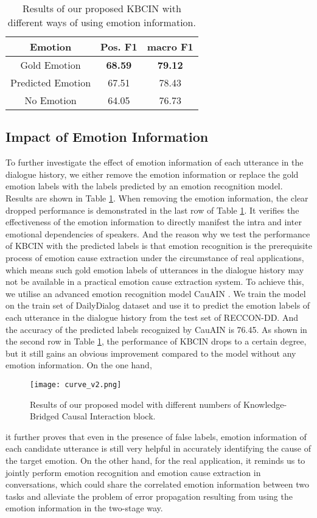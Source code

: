 \documentclass[letterpaper]{article} \usepackage{aaai23}  \usepackage{times}  \usepackage{helvet}  \usepackage{courier}  \usepackage[hyphens]{url}  \usepackage{graphicx} \urlstyle{rm} \def\UrlFont{\rm}  \usepackage{natbib}  \usepackage{caption} \frenchspacing  \setlength{\pdfpagewidth}{8.5in} \setlength{\pdfpageheight}{11in} \usepackage{algorithm}
\begin{document}
\begin{table}
\footnotesize
\centering
\begin{tabular}{ccc}
\toprule
\textbf{Emotion} & \textbf{Pos. F1} & \textbf{macro F1} \\
\midrule
Gold Emotion &\textbf{68.59} &\textbf{79.12} \\
Predicted Emotion &67.51 &78.43 \\
No Emotion &64.05 &76.73\\
\bottomrule
\end{tabular}
\caption{Results of our proposed KBCIN with different ways of using emotion information.}
\label{tab4}
\end{table}

\subsection{Impact of Emotion Information}
To further investigate the effect of emotion information of each utterance in the dialogue history, we either remove the emotion information or replace the gold emotion labels with the labels predicted by an emotion recognition model. Results are shown in Table \ref{tab4}. When removing the emotion information, the clear dropped performance is demonstrated in the last row of Table \ref{tab4}. It verifies the effectiveness of the emotion information to directly manifest the intra and inter emotional dependencies of speakers. And the reason why we test the performance of KBCIN with the predicted labels is that emotion recognition is the prerequisite process of emotion cause extraction under the circumstance of real applications, which means such gold emotion labels of utterances in the dialogue history may not be available in a practical emotion cause extraction system. To achieve this, we utilise an advanced emotion recognition model CauAIN \cite{cauain}. We train the model on the train set of DailyDialog \cite{dd} dataset and use it to predict the emotion labels of each utterance in the dialogue history from the test set of RECCON-DD. And the accuracy of the predicted labels recognized by CauAIN is 76.45. As shown in the second row in Table \ref{tab4}, the performance of KBCIN drops to a certain degree, but it still gains an obvious improvement compared to the model without any emotion information. On the one hand, 
\begin{figure}[htbp]
\centering
\texttt{[image: curve\_v2.png]}
\caption{Results of our proposed model with different numbers of Knowledge-Bridged Causal Interaction block.}
\label{curve}
\end{figure}
it further proves that even in the presence of false 
labels, emotion information of each candidate utterance 
is still very helpful in accurately identifying the cause of the target emotion. On the other hand, for the real application, it reminds us to jointly perform emotion recognition and emotion cause extraction in conversations, which could share the correlated emotion information between two tasks and alleviate the problem of error propagation resulting from using the emotion information in the two-stage way.
\end{document}

